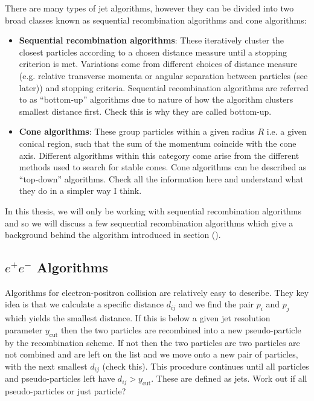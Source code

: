 There are many types of jet algorithms, however they can be divided into two broad classes known as sequential recombination algorithms and cone algorithms:
\begin{itemize}
	\item {\textbf{Sequential recombination algorithms}}: These iteratively cluster the closest particles according to a chosen distance measure until a stopping criterion is met. Variations come from different choices of distance measure (e.g. relative transverse momenta or angular separation between particles (see later)) and stopping criteria. Sequential recombination algorithms are referred to as \enquote{bottom-up} algorithms due to nature of how the algorithm clusters smallest distance first. {\color{blue} Check this is why they are called bottom-up.}
	\item {\textbf{Cone algorithms}}: These group particles within a given radius $R$ i.e. a given conical region, such that the sum of the momentum coincide with the cone axis. Different algorithms within this category come arise from the different methods used to search for stable cones. Cone algorithms can be described as \enquote{top-down} algorithms. {\color{blue} Check all the information here and understand what they do in a simpler way I think.}
\end{itemize}
In this thesis, we will only be working with sequential recombination algorithms and so we will discuss a few sequential recombination algorithms which give a background behind the algorithm introduced in section ().

\subsection{$e^+e^-$ Algorithms}
Algorithms for electron-positron collision are relatively easy to describe. They key idea is that we calculate a specific distance $d_{ij}$ and we find the pair $p_i$ and $p_j$ which yields the smallest distance. If this is below a given jet resolution parameter $y_{\mathrm{cut}}$ then the two particles are recombined into a new pseudo-particle by the recombination scheme. If not then the two particles are two particles are not combined and are left on the list and we move onto a new pair of particles, with the next smallest $d_{ij}$ {\color{blue} (check this)}. This procedure continues until all particles and pseudo-particles left have $d_{ij}>y_{\mathrm{cut}}$. These are defined as jets. {\color{blue} Work out if all pseudo-particles or just particle?}
